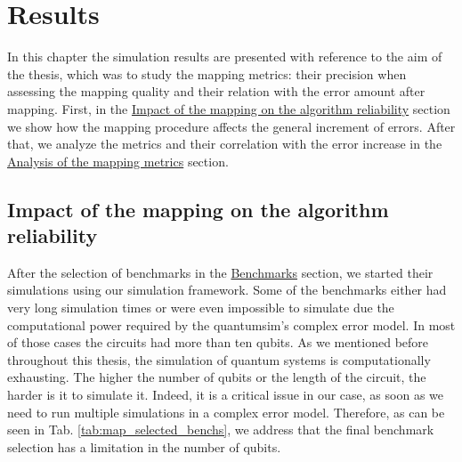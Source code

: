 
\chapter{Results}
\label{sec:orge13a8ae}

In this chapter the simulation results are presented with reference to the aim of the thesis, which was to study the mapping metrics:
their precision when assessing the mapping quality and their relation with the error amount after mapping.
First, in the \hyperref[sec:org0f1e697]{Impact of the mapping on the algorithm reliability} section we show how the mapping procedure affects the general increment of errors.
After that, we analyze the metrics and their correlation with the error increase in the \hyperref[sec:org13f1dfb]{Analysis of the mapping metrics} section.

\section{Impact of the mapping on the algorithm reliability}
\label{sec:org0f1e697}
After the selection of benchmarks in the \href{chapter-4.org}{Benchmarks} section, we started their simulations using our simulation framework.
Some of the benchmarks either had very long simulation times or were even impossible to simulate due the computational power required by the quantumsim's complex error model. 
In most of those cases the circuits had more than ten qubits.
As we mentioned before throughout this thesis, the simulation of quantum systems is computationally exhausting.
The higher the number of qubits or the length of the circuit, the harder is it to simulate it.
Indeed, it is a critical issue in our case, as soon as we need to run multiple simulations in a complex error model.
Therefore, as can be seen in Tab. \ref{tab:map_selected_benchs}, we address that the final benchmark selection has a limitation in the number of qubits.

